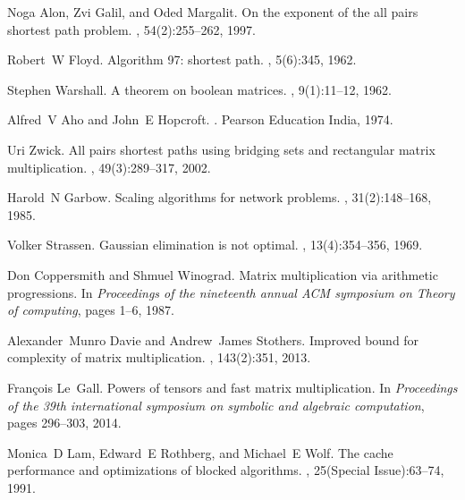 \documentclass[10pt,twocolumn,letterpaper]{article}
\begin{document}
{\small

%
\begin{thebibliography}{10}


Noga Alon, Zvi Galil, and Oded Margalit.
\newblock On the exponent of the all pairs shortest path problem.
, 54(2):255--262, 1997.


Robert~W Floyd.
\newblock Algorithm 97: shortest path.
, 5(6):345, 1962.


Stephen Warshall.
\newblock A theorem on boolean matrices.
, 9(1):11--12, 1962.

Alfred~V Aho and John~E Hopcroft.
.
\newblock Pearson Education India, 1974.


Uri Zwick.
\newblock All pairs shortest paths using bridging sets and rectangular matrix
  multiplication.
, 49(3):289--317, 2002.


Harold~N Garbow.
\newblock Scaling algorithms for network problems.
, 31(2):148--168, 1985.


Volker Strassen.
\newblock Gaussian elimination is not optimal.
, 13(4):354--356, 1969.


Don Coppersmith and Shmuel Winograd.
\newblock Matrix multiplication via arithmetic progressions.
\newblock In {\em Proceedings of the nineteenth annual ACM symposium on Theory
  of computing}, pages 1--6, 1987.

Alexander~Munro Davie and Andrew~James Stothers.
\newblock Improved bound for complexity of matrix multiplication.
, 143(2):351, 2013.

Fran{\c{c}}ois Le~Gall.
\newblock Powers of tensors and fast matrix multiplication.
\newblock In {\em Proceedings of the 39th international symposium on symbolic
  and algebraic computation}, pages 296--303, 2014.


Monica~D Lam, Edward~E Rothberg, and Michael~E Wolf.
\newblock The cache performance and optimizations of blocked algorithms.
, 25(Special Issue):63--74,
  1991.



\end{thebibliography}}
\end{document}
